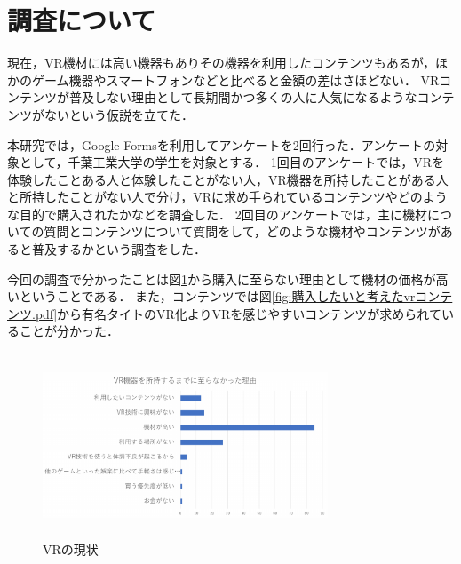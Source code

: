 \documentclass[twocolumn,10pt,a4j]{ltjsarticle}
\begin{document}



\section{調査について}
現在，VR機材には高い機器もありその機器を利用したコンテンツもあるが，ほかのゲーム機器やスマートフォンなどと比べると金額の差はさほどない．
VRコンテンツが普及しない理由として長期間かつ多くの人に人気になるようなコンテンツがないという仮説を立てた．

本研究では，Google Formsを利用してアンケートを2回行った．アンケートの対象として，千葉工業大学の学生を対象とする．
1回目のアンケートでは，VRを体験したことある人と体験したことがない人，VR機器を所持したことがある人と所持したことがない人で分け，VRに求め手られているコンテンツやどのような目的で購入されたかなどを調査した．
2回目のアンケートでは，主に機材についての質問とコンテンツについて質問をして，どのような機材やコンテンツがあると普及するかという調査をした．

今回の調査で分かったことは図\ref{fig:vr機器を所持するまでに至らなかった理由.pdf}から購入に至らない理由として機材の価格が高いということである．
また，コンテンツでは図\ref{fig:購入したいと考えたvrコンテンツ.pdf}から有名タイトのVR化よりVRを感じやすいコンテンツが求められていることが分かった．

\begin{figure}[h]
\begin{center}
 \includegraphics[clip,width=85mm,height=55mm]{vr機器を所持するまでに至らなかった理由.pdf}
\end{center}
 \caption{VRの現状}
 \label{fig:vr機器を所持するまでに至らなかった理由.pdf}
\end{figure}
\end{document}
